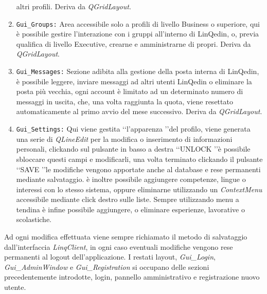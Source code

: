 \begin{enumerate}
    altri profili. Deriva da \textit{QGridLayout}.
    \item
    \texttt{Gui\_Groups:} Area accessibile solo a profili di livello Business o superiore, qui è possibile gestire l'interazione con i gruppi all'interno di LinQedin, o, previa qualifica di livello Executive,
    crearne e amministrarne di propri. Deriva da \textit{QGridLayout}.
    \item
    \texttt{Gui\_Messages:} Sezione adibita alla gestione della posta interna di LinQedin, è possibile leggere, inviare messaggi ad altri utenti LinQedin o eliminare la posta più vecchia, ogni account è limitato
    ad un determinato numero di messaggi in uscita, che, una volta raggiunta la quota, viene resettato automaticamente al primo avvio del mese successivo. Deriva da \textit{QGridLayout}.
    \item
    \texttt{Gui\_Settings:} Qui viene gestita \lq\lq l'apparenza \rq\rq del profilo, viene generata una serie di \textit{QLineEdit} per la modifica o inserimento di informazioni personali, clickando sul pulsante in basso
    a destra \lq\lq UNLOCK \rq\rq è possibile sbloccare questi campi e modificarli, una volta terminato clickando il pulsante \lq\lq SAVE \rq\rq le modifiche vengono apportate anche al database e rese permanenti mediante
    salvataggio.
    è inoltre possibile aggiungere competenze, lingue o interessi con lo stesso sistema, oppure eliminarne utilizzando un \textit{ContextMenu} accessibile mediante click destro sulle liste. Sempre utilizzando menu a tendina
    è infine possibile aggiungere, o eliminare esperienze, lavorative o scolastiche.
\end{enumerate}
Ad ogni modifica effettuata viene sempre richiamato il metodo di salvataggio dall'interfaccia \textit{LinqClient}, in ogni caso eventuali modifiche vengono rese permanenti al logout dell'applicazione.
I restati layout, \textit{Gui\_Login}, \textit{Gui\_AdminWindow} e \textit{Gui\_Registration} si occupano delle sezioni precedentemente introdotte, login, pannello amministrativo e registrazione nuovo utente.